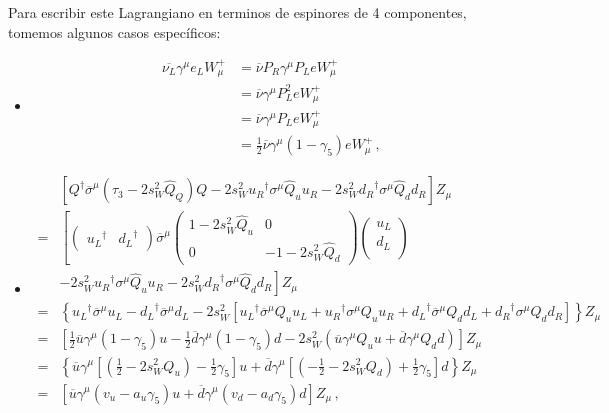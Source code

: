 Para escribir este Lagrangiano en terminos de espinores de 4 componentes, tomemos algunos casos específicos:
\begin{itemize}
\item 
\begin{align}
\label{eq:wf4}
  \overline{\nu_L}\gamma^\mu e_LW_\mu^+&=\overline{\nu}P_R\gamma^\mu P_LeW_\mu^+\nonumber\\
&=\overline{\nu}\gamma^\mu P_L^2eW_\mu^+\nonumber\\
&=\overline{\nu}\gamma^\mu P_LeW_\mu^+\nonumber\\
&=\frac{1}{2}\overline{\nu}\gamma^\mu(1-\gamma_5)eW_\mu^+\,,
\end{align}

\item
  \begin{align}
\label{eq:zf4}
    &\left[ Q^{\dagger}\overline{\sigma}^\mu\left( \tau_3-2s_W^2\widehat{Q}_Q\right)Q
      -2s_W^2{u_R}^{\dagger}\sigma^\mu\widehat{Q}_u u_R-2s_W^2{d_R}^{\dagger}\sigma^\mu\widehat{Q}_d d_R\right]Z_\mu\nonumber\\
=&\left[\begin{pmatrix}
      {u_L}^{\dagger} &{d_L}^{\dagger}
    \end{pmatrix}\overline{\sigma}^\mu
    \begin{pmatrix}
      1-2s_W^2\widehat{Q}_u & 0\\
      0 &-1-2s_W^2\widehat{Q}_d
    \end{pmatrix}
    \begin{pmatrix}
      u_L\\
      d_L\\
    \end{pmatrix}\right.\nonumber\\
    &\left.-2s_W^2{u_R}^{\dagger}\sigma^\mu\widehat{Q}_u u_R-2s_W^2{d_R}^{\dagger}\sigma^\mu\widehat{Q}_d d_R
  \right]Z_\mu\nonumber\\
    =&\left\{{u_L}^{\dagger}\overline{\sigma}^\mu u_L-{d_L}^{\dagger}\overline{\sigma}^\mu d_L
-2s_W^2\left[{u_L}^{\dagger}\overline{\sigma}^{\mu}Q_u u_L+{u_R}^{\dagger}\sigma^\mu Q_uu_R
+{d_L}^{\dagger}\overline{\sigma}^{\mu}Q_d d_L+{d_R}^{\dagger}\sigma^\mu Q_dd_R
\right]\right\}Z_\mu \nonumber\\
          =&\left[\frac{1}{2}\overline{u}\gamma^\mu(1-\gamma_5)u-\frac{1}{2}\overline{d}\gamma^\mu(1-\gamma_5)d
-2s_W^2\left(\overline{u}\gamma^\mu Q_u u
+\overline{d}\gamma^\mu Q_d d
\right)\right]Z_\mu\nonumber\\
        =&\left\{\overline{u}\gamma^\mu\left[\left(\frac{1}{2}-2s_W^2Q_u\right)-\frac{1}{2}\gamma_5\right]u+
\overline{d}\gamma^\mu\left[\left(-\frac{1}{2}-2s_W^2Q_d\right)+\frac{1}{2}\gamma_5\right]d
\right\}Z_\mu\nonumber\\
  =&\left[\overline{u}\gamma^\mu\left(v_u-a_u\gamma_5\right)u+\overline{d}\gamma^\mu\left(v_d-a_d\gamma_5\right)d\right]Z_\mu\,,
\end{align}


\end{itemize}
